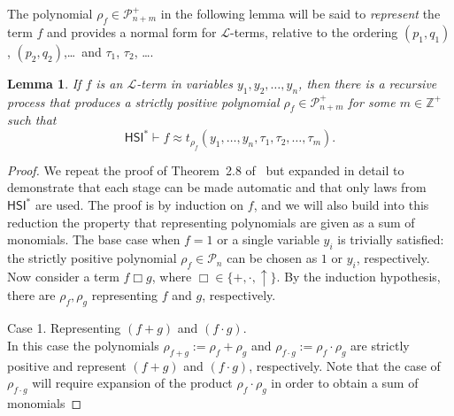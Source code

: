\documentclass[eqnor,reqno]{amsart}
\theoremstyle{plain}
\newtheorem{lem}[thm]{Lemma}
\theoremstyle{definition}
\newcommand{\HSI}{\textsf{HSI}}
\begin{document}
The polynomial $\rho_f\in \mathcal{P}_{n+m}^+$ in the following lemma will be said to \emph{represent} the term $f$ and provides a normal form for $\mathscr{L}$-terms, relative to the ordering  $(p_1,q_1)$, $(p_2,q_2)$,\dots\ and $\tau_1$, $\tau_2$, \dots.
\begin{lem}\label{lem:WilkieNormalForm}
If $f$ is an $\mathscr{L}$-term in variables $y_1,y_2, \dots ,y_n$, then there is a recursive process that produces a strictly positive polynomial $\rho_f \in \mathcal{P}_{n+m}^+$ for some $m \in \mathbb{Z^+}$  such that
\[
\HSI^* \vdash  f\approx t_{\rho_f}   (y_1, \dots , y_n,\tau_1, \tau_2, \dots, \tau_m).
\]
\end{lem}
\begin{proof}
We repeat the proof of Theorem~2.8 of~\cite{wil00} but expanded in detail to demonstrate that each stage can be made automatic and that only laws from $\HSI^*$ are used. 
The proof is by induction on $f$, and we will also build into this reduction the property that representing polynomials are given as a sum of monomials.
The base case when $f=1$ or a single variable $y_i$ is trivially satisfied: the strictly positive polynomial $\rho_f \in \mathcal{P}_n$ can be chosen as $1$ or $y_i$, respectively.  Now consider a term $f\mathbin{\Box} g$, where $\Box\in\{+,\cdot,\uparrow\}$.  By the induction hypothesis, there are $\rho_f , \rho_g$ representing $f $ and $g $, respectively.  

Case 1.  Representing $(f+g)$ and $(f\cdot g)$.\\
In this case the polynomials $\rho_{f+g}:=\rho_f+ \rho_g$ and $\rho_{f\cdot g}:=\rho_f \cdot \rho_g$ are strictly positive and represent  $(f+g)$ and $(f\cdot g)$, respectively.  
Note that the case of $\rho_{f\cdot g}$ will require expansion of the product $\rho_f \cdot \rho_g$ in order to obtain a sum of monomials


\end{proof}
\end{document}
